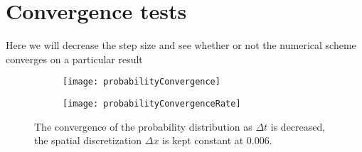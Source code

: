 \section{Convergence tests}
Here we will decrease the step size and see whether or not the numerical scheme converges on a particular result

\begin{figure}[b]
	\begin{subfigure}{0.49\textwidth}
		\texttt{[image: probabilityConvergence]}
	\end{subfigure}
	\begin{subfigure}{0.49\textwidth}
		\texttt{[image: probabilityConvergenceRate]}
	\end{subfigure}
\caption{The convergence of the probability distribution as $\Delta t$ is decreased, the spatial discretization $\Delta x$ is kept constant at 0.006.}
\label{fig:Convergence}
\end{figure}